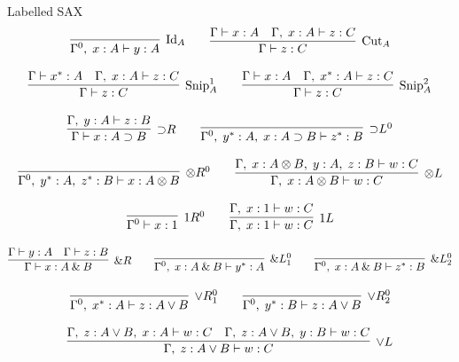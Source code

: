 \documentclass[9ps]{beamer}
\begin{document}
\begin{frame}{Labelled SAX}
\tiny
\[
  \infer[\text{Id}_A]{\Gamma^0,\; x : A \vdash y : A}{}
  \qquad
  \infer[\text{Cut}_A]{\Gamma \vdash z : C}{
    \Gamma \vdash x : A &
    \Gamma,\; x : A \vdash z : C
  }
\]

\[
  \infer[\text{Snip}_A^1]{\Gamma \vdash z : C}{
    \Gamma \vdash x^\ast : A &
    \Gamma,\; x : A \vdash z : C
  }
  \qquad
  \infer[\text{Snip}_A^2]{\Gamma \vdash z : C}{
    \Gamma \vdash x : A &
    \Gamma,\; x^\ast : A \vdash z : C
  }
\]

\[
  \infer[{\supset}R]{\Gamma \vdash x : A \supset B}{
    \Gamma,\; y : A \vdash z : B
  }
  \qquad
  \infer[{\supset}L^0]{\Gamma^0,\; y^\ast : A,\; x : A \supset B \vdash z^\ast : B}{}
\]

\[
  \infer[{\otimes}R^0]{\Gamma^0,\; y^\ast : A,\; z^\ast : B \vdash x : A \otimes B}{}
  \qquad
  \infer[{\otimes}L]{\Gamma,\; x : A \otimes B \vdash w : C}{
    \Gamma,\; x : A \otimes B,\; y : A,\; z : B \vdash w : C
  }
\]

\[
  \infer[1R^0]{\Gamma^0 \vdash x : 1}{}
  \qquad
  \infer[1L]{\Gamma,\; x : 1 \vdash w : C}{
    \Gamma,\; x : 1 \vdash w : C
  }
\]

\[
  \infer[{\&}R]{\Gamma \vdash x : A \mathbin{\&} B}{
    \Gamma \vdash y : A &
    \Gamma \vdash z : B
  }
  \qquad
  \infer[{\&}L_1^0]{\Gamma^0,\; x : A \mathbin{\&} B \vdash y^\ast : A}{}
  \qquad
  \infer[{\&}L_2^0]{\Gamma^0,\; x : A \mathbin{\&} B \vdash z^\ast : B}{}
\]

\[
  \infer[{\lor}R_1^0]{\Gamma^0,\; x^\ast : A \vdash z : A \vee B}{}
  \qquad
  \infer[{\lor}R_2^0]{\Gamma^0,\; y^\ast : B \vdash z : A \vee B}{}
\]

\[
  \infer[{\lor}L]{\Gamma,\; z : A \vee B \vdash w : C}{
    \Gamma,\; z : A \vee B,\; x : A \vdash w : C &
    \Gamma,\; z : A \vee B,\; y : B \vdash w : C
  }
\]
\end{frame}
\end{document}
